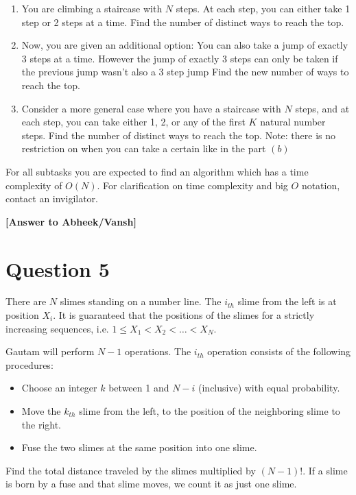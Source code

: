 \documentclass[a4paper,12pt]{article}
\begin{document}
\begin{enumerate}[label=\alph*)]
    \item You are climbing a staircase with $N$ steps. At each step, you can either take 1 step or 2 steps at a time. Find the number of distinct ways to reach the top.

    \item Now, you are given an additional option: You can also take a jump of exactly 3 steps at a time. However the jump of exactly 3 steps can only be taken if the previous jump wasn't also a 3 step jump Find the new number of ways to reach the top.

    \item Consider a more general case where you have a staircase with $N$ steps, and at each step, you can take either 1, 2, or any of the first $K$ natural number steps. Find the number of distinct ways to reach the top. Note: there is no restriction on when you can take a certain like in the part $(b)$
\end{enumerate}
For all subtasks you are expected to find an algorithm which has a time complexity of $O(N)$. 
For clarification on time complexity and big $O$ notation, contact an invigilator.

\textbf{[Answer to Abheek/Vansh]}

\hrulefill

\section*{Question 5}

There are $N$ slimes standing on a number line. The $i_{th}$ slime from the left is at position $X_i$. It is guaranteed that the positions of the slimes for a strictly increasing sequences, i.e. $1 \le X_1 < X_2 < \dots < X_N$.

Gautam will perform $N - 1$ operations. The $i_{th}$ operation consists of the following procedures:
\begin{itemize}
    \item Choose an integer $k$ between 1 and $N - i$ (inclusive) with equal probability.
    \item Move the $k_{th}$ slime from the left, to the position of the neighboring slime to the right.
    \item Fuse the two slimes at the same position into one slime. 
\end{itemize}

Find the total distance traveled by the slimes multiplied by $(N - 1)!$.  If a slime is born by a fuse and that slime moves, we count it as just one slime.
\end{document}
